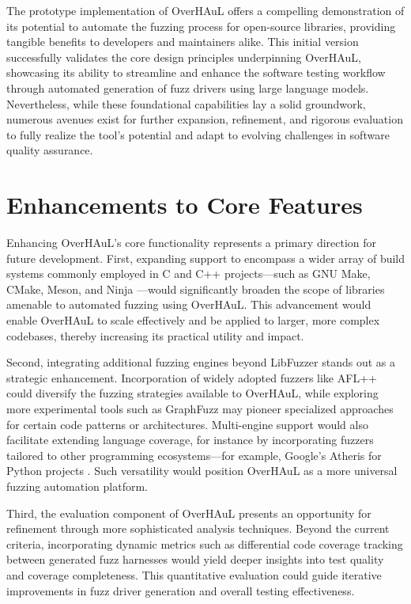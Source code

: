 \documentclass[
  a4paper,
]{scrreprt}
\theoremstyle{definition}
\theoremstyle{remark}
\begin{document}
The prototype implementation of OverHAuL offers a compelling
demonstration of its potential to automate the fuzzing process for
open-source libraries, providing tangible benefits to developers and
maintainers alike. This initial version successfully validates the core
design principles underpinning OverHAuL, showcasing its ability to
streamline and enhance the software testing workflow through automated
generation of fuzz drivers using large language models. Nevertheless,
while these foundational capabilities lay a solid groundwork, numerous
avenues exist for further expansion, refinement, and rigorous evaluation
to fully realize the tool's potential and adapt to evolving challenges
in software quality assurance.

\section{Enhancements to Core
Features}\label{enhancements-to-core-features}

Enhancing OverHAuL's core functionality represents a primary direction
for future development. First, expanding support to encompass a wider
array of build systems commonly employed in C and C++ projects---such as
GNU Make, CMake, Meson, and Ninja
\autocite{cedilnik2000,feldman1979,martin2025,pakkanen2025}---would
significantly broaden the scope of libraries amenable to automated
fuzzing using OverHAuL. This advancement would enable OverHAuL to scale
effectively and be applied to larger, more complex codebases, thereby
increasing its practical utility and impact.

Second, integrating additional fuzzing engines beyond LibFuzzer stands
out as a strategic enhancement. Incorporation of widely adopted fuzzers
like AFL++ \autocite{aflpp} could diversify the fuzzing strategies
available to OverHAuL, while exploring more experimental tools such as
GraphFuzz \autocite{green2022} may pioneer specialized approaches for
certain code patterns or architectures. Multi-engine support would also
facilitate extending language coverage, for instance by incorporating
fuzzers tailored to other programming ecosystems---for example, Google's
Atheris for Python projects \autocite{atheris}. Such versatility would
position OverHAuL as a more universal fuzzing automation platform.

Third, the evaluation component of OverHAuL presents an opportunity for
refinement through more sophisticated analysis techniques. Beyond the
current criteria, incorporating dynamic metrics such as differential
code coverage tracking between generated fuzz harnesses would yield
deeper insights into test quality and coverage completeness. This
quantitative evaluation could guide iterative improvements in fuzz
driver generation and overall testing effectiveness.
\end{document}
